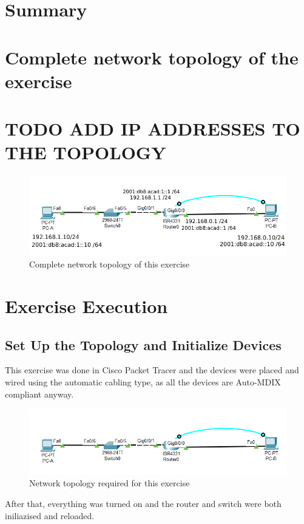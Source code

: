 \documentclass[a4paper]{article}
\newcommand{\abc}{\hfill \break}
\begin{document}
\section{Summary}

\newpage

\section{Complete network topology of the exercise}
\section{TODO ADD IP ADDRESSES TO THE TOPOLOGY}
\begin{figure}[h]
	\includegraphics[scale=0.65]{images/nwtopology2.png}
	\centering
	\caption{Complete network topology of this exercise}
\end{figure}

\newpage

\section{Exercise Execution}
\subsection{Set Up the Topology and Initialize Devices}
This exercise was done in Cisco Packet Tracer and the devices were placed and wired using the automatic cabling type, as all the devices are Auto-MDIX compliant anyway.\abc
\begin{figure}[h]
	\includegraphics[scale=0.45]{images/nwtopology.png}
	\centering
	\caption{Network topology required for this exercise}
\end{figure}\abc
After that, everything was turned on and the router and switch were both iniliazised and reloaded.
\end{document}
